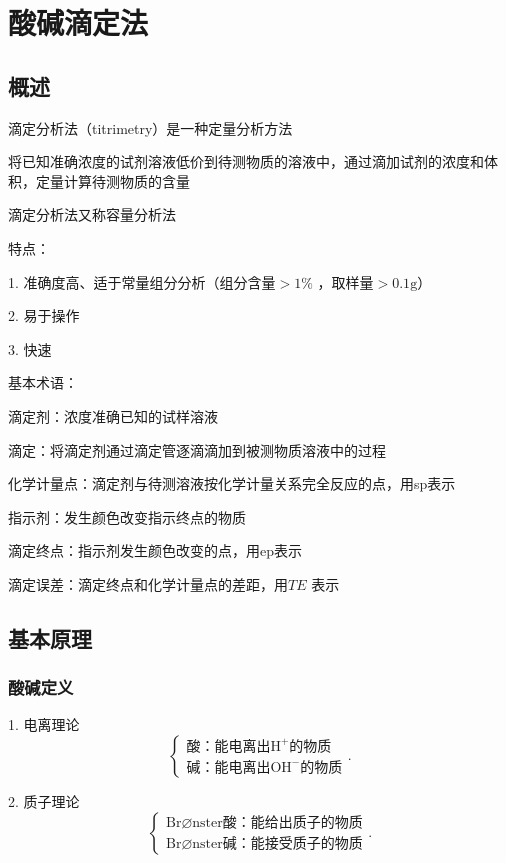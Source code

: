 \section{酸碱滴定法}%
\label{sec:酸碱滴定法}
\subsection{概述}%
\label{sub:概述}
滴定分析法（titrimetry）是一种定量分析方法

\begin{notation}
    将已知准确浓度的试剂溶液低价到待测物质的溶液中，通过滴加试剂的浓度和体积，定量计算待测物质的含量

    滴定分析法又称容量分析法
\end{notation}
特点：

1. 准确度高、适于常量组分分析（组分含量$>1\%$ ，取样量$>0.1\text{g}$）

2. 易于操作

3. 快速

\begin{notation}
    基本术语：

    滴定剂：浓度准确已知的试样溶液

    滴定：将滴定剂通过滴定管逐滴滴加到被测物质溶液中的过程

    化学计量点：滴定剂与待测溶液按化学计量关系完全反应的点，用sp表示

    指示剂：发生颜色改变指示终点的物质

    滴定终点：指示剂发生颜色改变的点，用ep表示

    滴定误差：滴定终点和化学计量点的差距，用$TE$ 表示
\end{notation}
\subsection{基本原理}%
\label{sub:基本原理}
\subsubsection{酸碱定义}%
\label{subsub:酸碱定义}
1. 电离理论
\[
    \begin{cases}
        \text{酸：能电离出}\text{H}^{+} \text{的物质}\\
        \text{碱：能电离出}\text{OH} ^{-}\text{的物质}
    \end{cases}
.\] 

2. 质子理论
\[
    \begin{cases}
    \text{Br}\varnothing\text{nster酸：能给出质子的物质}\\
    \text{Br}\varnothing\text{nster碱：能接受质子的物质}
    \end{cases}
.\] 

